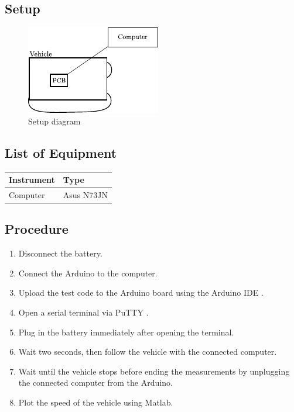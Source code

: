 \subsection{Setup}
\begin{figure}[H]
	\centering
	\includegraphics[scale=1.6]{figures/inertiaTestSetupDiagram2.pdf}
	\caption{Setup diagram}
	\label{inertiaTestSetupDiagram}
\end{figure}

\subsection{List of Equipment}

\begin{table}[H]
\begin{tabular}{|p{10cm}|p{4cm}|}
\hline%
  \textbf{Instrument}                     &  \textbf{Type}       \\
\hline%
  Computer                                &  Asus N73JN    \\
\hline %
\end{tabular}
\end{table}

\subsection{Procedure}

\begin{enumerate}
  \item Disconnect the battery.
  \item Connect the Arduino to the computer.
  \item Upload the test code to the Arduino board using the Arduino IDE  \cite{ArduinoIDE}.
  \item Open a serial terminal via PuTTY \cite{PuTTY}.
  \item Plug in the battery immediately after opening the terminal.
  \item Wait two seconds, then follow the vehicle with the connected computer.
  \item Wait until the vehicle stops before ending the measurements by unplugging the connected computer from the Arduino.
  \item Plot the speed of the vehicle using Matlab.
\end{enumerate}

